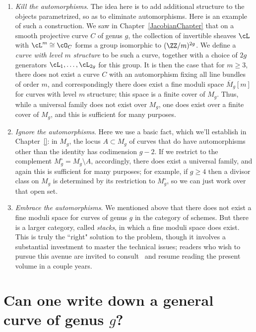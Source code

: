 \begin{enumerate}
\item \emph{Kill the automorphisms}. The idea here is to add additional structure to the objects parametrized, so as to eliminate automorphisms. Here is an example of such a construction. We saw in Chapter~\ref{JacobianChapter} that on a smooth projective curve $C$ of genus $g$, the collection of invertible sheaves $\cL$ with $\cL^m \cong \cO_C$ forms a group isomorphic to $(\ZZ/m)^{2g}$. We define a \emph{curve with level $m$ structure} to be such a curve, together with a choice of $2g$ generators $\cL_1,\dots,\cL_{2g}$ for this group. It is then the case that for $m \geq 3$, there 
does not exist a curve $C$ with an automorphism fixing all line bundles of order $m$, and correspondingly there does 
exist a fine moduli space $\overline M_g[m]$ for curves with level $m$ structure; this space is a finite cover of $M_g$. Thus, while a universal family does not exist over $M_g$, one does exist over a finite cover of $M_g$, and this is sufficient for many purposes.

\item \emph {Ignore the automorphisms}.
Here we use a basic fact, which we'll establish in Chapter~\ref{}: in $M_g$, the locus $A \subset M_g$ of curves that do have automorphisms other than the identity has codimension $g-2$. If we restrict to the complement $M_g^\circ = M_g \setminus A$, accordingly, there does exist a universal family, and again this is sufficient for many purposes; for example, if $g \geq 4$ then a divisor class on $M_g$ is determined by its restriction to $M_g^\circ$, so we can just work over that open set.

\item \emph{Embrace the automorphisms}. We mentioned above that there does not exist a fine moduli space for curves of genus $g$ in the category of schemes. But there is a larger category, called \emph{stacks}, in which a fine moduli space does exist. This is truly the ``right" solution to the problem, though it involves a substantial investment to master the technical issues; readers who wish to pursue this avenue are invited to consult~\cite{Olssen} and resume reading the present volume in a couple years.
\end{enumerate} 

\section{Can one write down a general curve of genus $g$?}\label{mgunirational}

